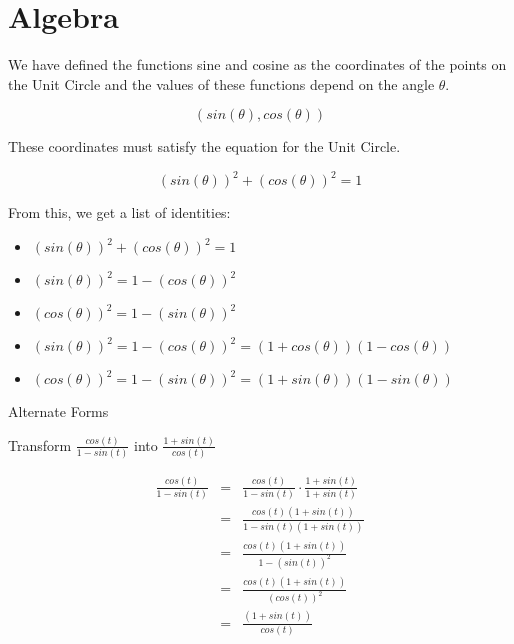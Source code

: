 \documentclass{ximera}
\begin{document}
\section{Algebra}

We have defined the functions sine and cosine as the coordinates of the points on the Unit Circle and the values of these functions depend on the angle $\theta$.

\[    ( sin(\theta), cos(\theta) ) \]


These coordinates must satisfy the equation for the Unit Circle. 



\[    ( sin(\theta) )^2 + ( cos(\theta) )^2 = 1 \]



From this, we get a list of identities:






\begin{itemize}
\item $( sin(\theta) )^2 + ( cos(\theta) )^2 = 1$
\item $( sin(\theta) )^2 =  1 - ( cos(\theta) )^2$
\item $( cos(\theta) )^2 =  1 - ( sin(\theta) )^2$
\item $( sin(\theta) )^2 =  1 - ( cos(\theta) )^2 = (1 + cos(\theta))(1 - cos(\theta))$
\item $( cos(\theta) )^2 =  1 - ( sin(\theta) )^2 = (1 + sin(\theta))(1 - sin(\theta))$
\end{itemize}





\begin{example} Alternate Forms


Transform $\frac{cos(t)}{1 - sin(t)}$ into $\frac{1 + sin(t)}{cos(t)}$



\begin{explanation}

\begin{align*}
\frac{cos(t)}{1 - sin(t)}  &  = &  \frac{cos(t)}{1 - sin(t)}  \cdot \frac{1 + sin(t)}{1 + sin(t)}  \\
                           &  = &  \frac{cos(t)(1 + sin(t))}{1 - sin(t)(1 + sin(t))}  \\
                           &  = &  \frac{cos(t)(1 + sin(t))}{1 - (sin(t))^2}  \\
                           &  = &  \frac{cos(t)(1 + sin(t))}{(cos(t))^2}  \\
                           &  = &  \frac{(1 + sin(t))}{cos(t)}  
\end{align*}



\end{explanation}




\end{example}
\end{document}
